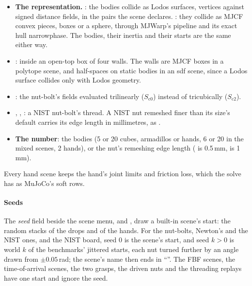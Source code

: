 \begin{itemize}
\item \textbf{The representation.} : the bodies collide as Lodos surfaces, vertices against signed distance fields, in the pairs the scene declares. : they collide as MJCF convex pieces, boxes or a sphere, through MJWarp's pipeline and its exact hull narrowphase. The bodies, their inertia and their starts are the same either way.
\item {}: inside an open-top box of four walls. The walls are MJCF boxes in a polytope scene, and half-spaces on static bodies in an sdf scene, since a Lodos surface collides only with Lodos geometry.
\item {}: the nut-bolt's fields evaluated trilinearly ($S_{\mathrm{c0}}$) instead of tricubically ($S_{\mathrm{c2}}$).
\item {}, , : a NIST nut-bolt's thread. A NIST nut remeshed finer than its size's default carries its edge length in millimetres, as .
\item \textbf{The number}: the bodies (5 or 20 cubes, armadillos or hands, 6 or 20 in the mixed scenes, 2 hands), or the nut's remeshing edge length ( is 0.5\,mm,  is 1\,mm).
\end{itemize}

Every hand scene keeps the hand's joint limits and friction loss, which the solve has as MuJoCo's soft rows.

\paragraph{Seeds} The \emph{seed} field beside the scene menu, and , draw a built-in scene's start: the random stacks of the drops and of the hands. For the nut-bolts, Newton's and the NIST ones, and the NIST board, seed 0 is the scene's start, and seed $k > 0$ is world $k$ of the benchmarks' jittered starts, each nut turned further by an angle drawn from $\pm 0.05$\,rad; the scene's name then ends in ``''. The FBF scenes, the time-of-arrival scenes, the two grasps, the driven nuts and the threading replays have one start and ignore the seed.

